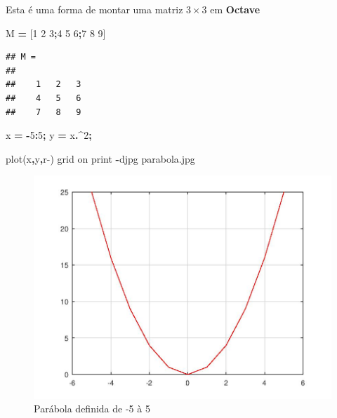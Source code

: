 \documentclass[
]{book}
\newenvironment{Shaded}{\begin{snugshade}}{\end{snugshade}}
\newcommand{\FloatTok}[1]{\textcolor[rgb]{0.00,0.00,0.81}{#1}}
\newcommand{\FunctionTok}[1]{\textcolor[rgb]{0.00,0.00,0.00}{#1}}
\newcommand{\NormalTok}[1]{#1}
\newcommand{\OperatorTok}[1]{\textcolor[rgb]{0.81,0.36,0.00}{\textbf{#1}}}
\newcommand{\StringTok}[1]{\textcolor[rgb]{0.31,0.60,0.02}{#1}}
\begin{document}
Esta é uma forma de montar uma matriz \(3 \times 3\) em \textbf{Octave}

\begin{Shaded}
\begin{Highlighting}[]
\NormalTok{M }\OperatorTok{=}\NormalTok{ [}\FloatTok{1} \FloatTok{2} \FloatTok{3}\OperatorTok{;}\FloatTok{4} \FloatTok{5} \FloatTok{6}\OperatorTok{;}\FloatTok{7} \FloatTok{8} \FloatTok{9}\NormalTok{]}
\end{Highlighting}
\end{Shaded}

\begin{verbatim}
## M =
## 
##    1   2   3
##    4   5   6
##    7   8   9
\end{verbatim}

\begin{Shaded}
\begin{Highlighting}[]
\NormalTok{x }\OperatorTok{=} \OperatorTok{{-}}\FloatTok{5}\OperatorTok{:}\FloatTok{5}\OperatorTok{;}
\NormalTok{y }\OperatorTok{=}\NormalTok{ x}\OperatorTok{.\^{}}\FloatTok{2}\OperatorTok{;}

\FunctionTok{plot}\NormalTok{(x}\OperatorTok{,}\NormalTok{y}\OperatorTok{,}\StringTok{\textquotesingle{}r{-}\textquotesingle{}}\NormalTok{)}
\FunctionTok{grid}\NormalTok{ on}
\FunctionTok{print} \OperatorTok{{-}}\NormalTok{djpg parabola.jpg}
\end{Highlighting}
\end{Shaded}

\begin{figure}
\centering
\includegraphics{parabola.jpg}
\caption{Parábola definida de -5 à 5}
\end{figure}
\end{document}
